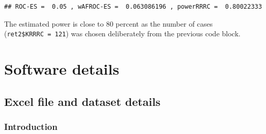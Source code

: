 \documentclass[
]{book}
\newenvironment{Shaded}{\begin{snugshade}}{\end{snugshade}}
\newcommand{\AttributeTok}[1]{\textcolor[rgb]{0.77,0.63,0.00}{#1}}
\newcommand{\ConstantTok}[1]{\textcolor[rgb]{0.00,0.00,0.00}{#1}}
\newcommand{\DecValTok}[1]{\textcolor[rgb]{0.00,0.00,0.81}{#1}}
\newcommand{\FunctionTok}[1]{\textcolor[rgb]{0.00,0.00,0.00}{#1}}
\newcommand{\NormalTok}[1]{#1}
\newcommand{\OtherTok}[1]{\textcolor[rgb]{0.56,0.35,0.01}{#1}}
\newcommand{\SpecialCharTok}[1]{\textcolor[rgb]{0.00,0.00,0.00}{#1}}
\newcommand{\StringTok}[1]{\textcolor[rgb]{0.31,0.60,0.02}{#1}}
\begin{document}
\begin{Shaded}
\end{Shaded}

\begin{verbatim}
## ROC-ES =  0.05 , wAFROC-ES =  0.063086196 , powerRRRC =  0.80022333
\end{verbatim}

The estimated power is close to 80 percent as the number of cases (\texttt{ret2\$KRRRC\ =\ 121}) was chosen deliberately from the previous code block.

\hypertarget{part-software-details}{%
\part*{Software details}\label{part-software-details}}

\hypertarget{dataset-object-details}{%
\chapter{Excel file and dataset details}\label{dataset-object-details}}

\hypertarget{introduction-1}{%
\section{Introduction}\label{introduction-1}}
\end{document}

